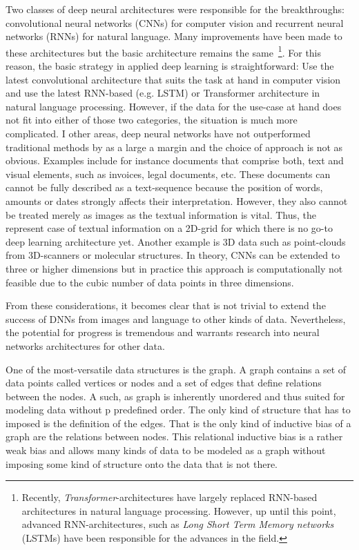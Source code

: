Two classes of deep neural architectures were responsible for the breakthroughs: convolutional neural networks (CNNs) for computer vision and recurrent neural networks (RNNs) for natural language. Many improvements have been made to these architectures but the basic architecture remains the same~\footnote{Recently, \textit{Transformer}-architectures have largely replaced RNN-based architectures in natural language processing. However, up until this point, advanced RNN-architectures, such as \textit{Long Short Term Memory networks} (LSTMs) have been responsible for the advances in the field.}. For this reason, the basic strategy in applied deep learning is straightforward: Use the latest convolutional architecture that suits the task at hand in computer vision and use the latest RNN-based (e.g. LSTM) or Transformer architecture in natural language processing. However, if the data for the use-case at hand does not fit into either of those two categories, the situation is much more complicated. I other areas, deep neural networks have not outperformed traditional methods by as a large a margin and the choice of approach is not as obvious. Examples include for instance documents that comprise both, text and visual elements, such as invoices, legal documents, etc. These documents can cannot be fully described as a text-sequence because the position of words, amounts or dates strongly affects their interpretation. However, they also cannot be treated merely as images as the textual information is vital. Thus, the represent case of textual information on a 2D-grid for which there is no go-to deep learning architecture yet. Another example is 3D data such as point-clouds from 3D-scanners or molecular structures. In theory, CNNs can be extended to three or higher dimensions but in practice this approach is computationally not feasible due to the cubic number of data points in three dimensions.

From these considerations, it becomes clear that is not trivial to extend the success of DNNs from images and language to other kinds of data. Nevertheless, the potential for progress is tremendous and warrants research into neural networks architectures for other data.

One of the most-versatile data structures is the graph. A graph contains a set of data points called vertices or nodes and a set of edges that define relations between the nodes. A such, as graph is inherently unordered and thus suited for modeling data without p predefined order. The only kind of structure that has to imposed is the definition of the edges. That is the only kind of inductive bias of a graph are the relations between nodes. This relational inductive bias is a rather weak bias and allows many kinds of data to be modeled as a graph without imposing some kind of structure onto the data that is not there.

